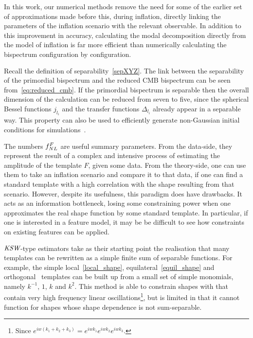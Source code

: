 In this work, our numerical methods remove the need for some of the
earlier set of approximations
made before this, during inflation, directly linking the parameters of the inflation scenario
with the relevant observable.
In addition to this improvement in accuracy, calculating the modal decomposition
directly from the model of inflation is far more efficient 
than numerically calculating the bispectrum configuration by configuration.


Recall the definition of separability~\eqref{sepXYZ}.
The link between the separability of the primordial bispectrum
and the reduced CMB bispectrum can be seen from~\eqref{eq:reduced_cmb}.
If the primordial bispectrum is separable then the overall dimension
of the calculation can be reduced from seven to five, 
since the spherical Bessel functions $j_{l_i}$ and the
transfer functions $\Delta_{l_i}$ already appear in a separable way.
This property can also be used to
efficiently generate non-Gaussian initial conditions
for simulations~\cite{Scoccimarro_2012}.


The numbers $f_{NL}^F$ are useful summary parameters.
From the data-side, they represent the result of
a complex and intensive process
of estimating the amplitude of the template $F$,
given some data. From the theory-side, one
can use them to take an inflation scenario and compare it
to that data, if one can find a standard template
with a high correlation with the shape resulting
from that scenario.
However, despite its usefulness, this paradigm does
have drawbacks. It acts as an information bottleneck,
losing some constraining power when one approximates
the real shape function by some standard template.
In particular, if one is interested in a feature model,
it may be be difficult to see how constraints on existing
features can be applied.


    ${\textit{\text{KSW}}}$-type estimators take as their starting point the realisation that many
    templates can be rewritten as a simple finite sum of separable functions.
    For example, the simple local~\eqref{local_shape}, equilateral~\eqref{equil_shape}
    and orthogonal~\cite{Planck_NG_2013}
    templates can be built up from a small set of
    simple monomials, namely $k^{-1}$, $1$, $k$ and $k^{2}$.
    This method is able to constrain shapes with that contain very high frequency linear oscillations\footnote{
    Since $e^{iw(k_1+k_2+k_3)}=e^{iwk_1}e^{iwk_2}e^{iwk_3}$.},
    but is limited in that it cannot function for shapes whose shape dependence is not
    sum-separable.


